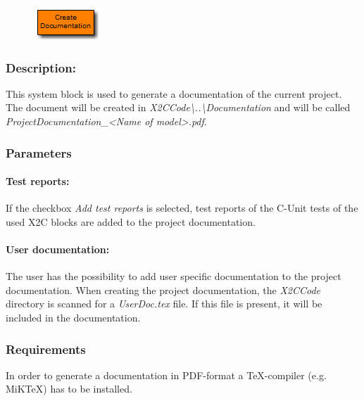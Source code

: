 \label{block:CreateDocumentation}
\begin{figure}[H]\includegraphics{CreateDocumentation}\end{figure} 

\subsubsection*{Description:}
This system block is used to generate a documentation of the current project. The document will be created in \textit{X2CCode\textbackslash ..\textbackslash Documentation} and will be called \textit{ProjectDocumentation_<Name of model>.pdf}.

\subsubsection*{Parameters}
\paragraph*{Test reports:}
If the checkbox \textit{Add test reports} is selected, test reports of the C-Unit tests of the used X2C blocks are added to the project documentation.

\paragraph*{User documentation:}
The user has the possibility to add user specific documentation to the project documentation. When creating the project documentation, the \textit{X2CCode} directory is scanned for a \textit{UserDoc.tex} file. If this file is present, it will be included in the documentation.

\subsubsection*{Requirements}
In order to generate a documentation in PDF-format a TeX-compiler (e.g. MiKTeX) has to be installed.


